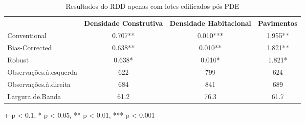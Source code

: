 \begin{table}[h]
\centering
\caption{Resultados do RDD apenas com lotes edificados pós PDE} 
\fontsize{10pt}{12pt}\selectfont
\begin{tabular*}{.85\linewidth}{@{\extracolsep{\fill}}lccc}
\toprule
  & Densidade Construtiva & Densidade Habitacional & Pavimentos \\ 
\midrule\addlinespace[2.5pt]
Conventional & 0.707** & 0.010*** & 1.955** \\ 
Bias-Corrected & 0.638** & 0.010** & 1.821** \\ 
{Robust} & {0.638*} & {0.010*} & {1.821*} \\ 
\midrule
Observações.à.esquerda & 622 & 799 & 624 \\ 
Observações.à.direita & 684 & 841 & 689 \\ 
Largura.de.Banda & 61.2 & 76.3 & 61.7 \\ 
\bottomrule
\end{tabular*}
\begin{minipage}{.85\linewidth}
+ p < 0.1, * p < 0.05, ** p < 0.01, *** p < 0.001\\
\end{minipage}
\label{tab:rdd-IPTU}
\end{table}


